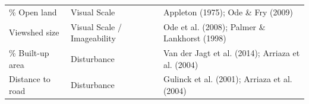 \documentclass[hidelinks, 11pt]{article}
\begin{document}
\begin{table}[ht]
\begin{tabular}{lll}
\addlinespace
\% Open land             & Visual Scale                & Appleton (1975); Ode \& Fry (2009) \\
\addlinespace
Viewshed size            & Visual Scale / Imageability & Ode et al. (2008); Palmer \& Lankhorst (1998) \\
\addlinespace
\% Built-up area         & Disturbance                 & Van der Jagt et al. (2014); Arriaza et al. (2004) \\
\addlinespace
Distance to road         & Disturbance                 & Gulinck et al. (2001); Arriaza et al. (2004) \\
\bottomrule
\end{tabular}
\end{table}

\clearpage

\clearpage


\end{document}
